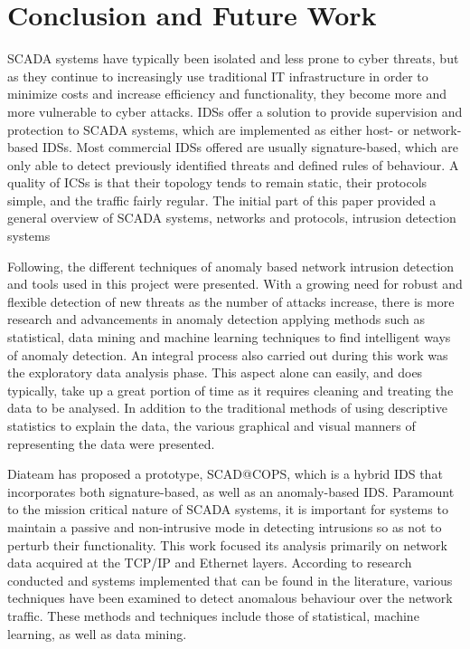 \documentclass[12pt,]{article}
\begin{document}
\section{Conclusion and Future Work}\label{conclusion-and-future-work}

SCADA systems have typically been isolated and less prone to cyber
threats, but as they continue to increasingly use traditional IT
infrastructure in order to minimize costs and increase efficiency and
functionality, they become more and more vulnerable to cyber attacks.
IDSs offer a solution to provide supervision and protection to SCADA
systems, which are implemented as either host- or network-based IDSs.
Most commercial IDSs offered are usually signature-based, which are only
able to detect previously identified threats and defined rules of
behaviour. A quality of ICSs is that their topology tends to remain
static, their protocols simple, and the traffic fairly regular. The
initial part of this paper provided a general overview of SCADA systems,
networks and protocols, intrusion detection systems

Following, the different techniques of anomaly based network intrusion
detection and tools used in this project were presented. With a growing
need for robust and flexible detection of new threats as the number of
attacks increase, there is more research and advancements in anomaly
detection applying methods such as statistical, data mining and machine
learning techniques to find intelligent ways of anomaly detection. An
integral process also carried out during this work was the exploratory
data analysis phase. This aspect alone can easily, and does typically,
take up a great portion of time as it requires cleaning and treating the
data to be analysed. In addition to the traditional methods of using
descriptive statistics to explain the data, the various graphical and
visual manners of representing the data were presented.

Diateam has proposed a prototype, SCAD@COPS, which is a hybrid IDS that
incorporates both signature-based, as well as an anomaly-based IDS.
Paramount to the mission critical nature of SCADA systems, it is
important for systems to maintain a passive and non-intrusive mode in
detecting intrusions so as not to perturb their functionality. This work
focused its analysis primarily on network data acquired at the TCP/IP
and Ethernet layers. According to research conducted and systems
implemented that can be found in the literature, various techniques have
been examined to detect anomalous behaviour over the network traffic.
These methods and techniques include those of statistical, machine
learning, as well as data mining.
\end{document}
